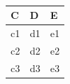 \begin{table}

\caption{}
\centering
\begin{tabular}[t]{l|l|l}
\hline
C & D & E\\
\hline
c1 & d1 & e1\\
\hline
c2 & d2 & e2\\
\hline
c3 & d3 & e3\\
\hline
\end{tabular}
\end{table}
